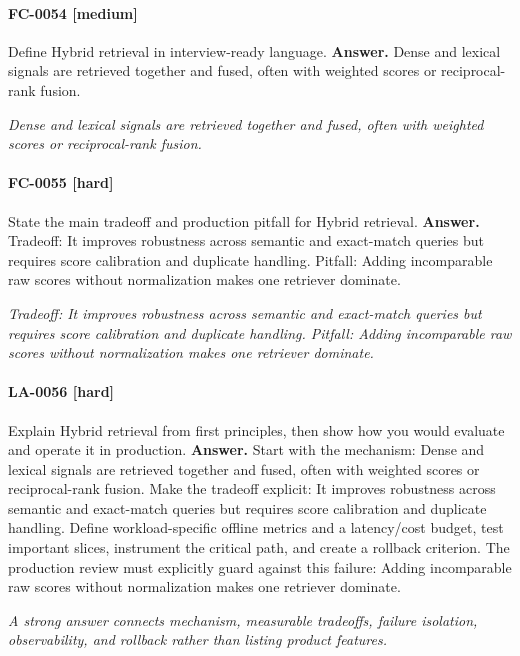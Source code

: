 \paragraph{FC-0054 [medium]} Define Hybrid retrieval in interview-ready language.
\noindent\textbf{Answer.} Dense and lexical signals are retrieved together and fused, often with weighted scores or reciprocal-rank fusion.
\par\textit{Dense and lexical signals are retrieved together and fused, often with weighted scores or reciprocal-rank fusion.}
\paragraph{FC-0055 [hard]} State the main tradeoff and production pitfall for Hybrid retrieval.
\noindent\textbf{Answer.} Tradeoff: It improves robustness across semantic and exact-match queries but requires score calibration and duplicate handling. Pitfall: Adding incomparable raw scores without normalization makes one retriever dominate.
\par\textit{Tradeoff: It improves robustness across semantic and exact-match queries but requires score calibration and duplicate handling. Pitfall: Adding incomparable raw scores without normalization makes one retriever dominate.}
\paragraph{LA-0056 [hard]} Explain Hybrid retrieval from first principles, then show how you would evaluate and operate it in production.
\noindent\textbf{Answer.} Start with the mechanism: Dense and lexical signals are retrieved together and fused, often with weighted scores or reciprocal-rank fusion. Make the tradeoff explicit: It improves robustness across semantic and exact-match queries but requires score calibration and duplicate handling. Define workload-specific offline metrics and a latency/cost budget, test important slices, instrument the critical path, and create a rollback criterion. The production review must explicitly guard against this failure: Adding incomparable raw scores without normalization makes one retriever dominate.
\par\textit{A strong answer connects mechanism, measurable tradeoffs, failure isolation, observability, and rollback rather than listing product features.}
